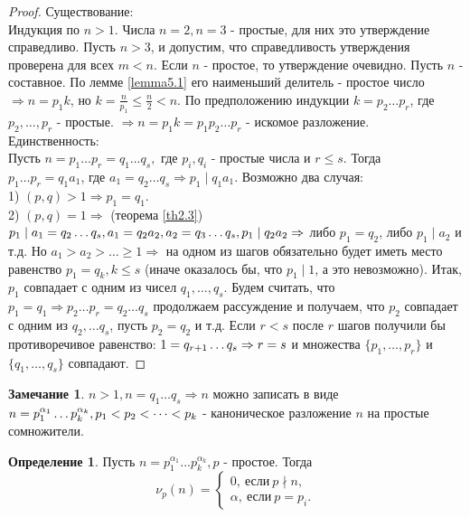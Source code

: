 \documentclass[a4paper, 12pt]{article}
\renewcommand{\div}{\mid}
\newcommand{\ndiv}{\nmid}
\theoremstyle{definition}
\newtheorem{definition}{Определение}[section]
\newtheorem*{comm}{Замечание}
\begin{document}
    \begin{proof}
        Существование:\\ Индукция по $n>1$. Числа $n=2, n=3$ - простые, для них это утверждение справедливо. Пусть $n>3$, и допустим, что справедливость утверждения проверена для всех $m<n$. Если $n$ - простое, то утверждение очевидно. Пусть $n$ - составное. По лемме \ref{lemma5.1} его наименьший делитель - простое число $\Rightarrow n=p_1k$, но $k=\frac{n}{p_1}\leq \frac{n}{2}<n$. По предположению индукции $k=p_2\dots p_r$, где $p_2,\dots,p_r$ - простые. $\Rightarrow n=p_1k=p_1p_2\dots p_r$ - искомое разложение.\\
        Единственность:\\
        Пусть $n=p_1\dots p_r=q_1\dots q_s,$ где $p_i,q_i$ - простые числа и $r\leq s$. Тогда\\ $p_1\dots p_r=q_1a_1$, где $a_1=q_2\dots q_s \Rightarrow p_1 \div q_1a_1$. Возможно два случая:\\
        1) $(p,q)>1 \Rightarrow p_1=q_1$.\\
        2) $(p,q)=1 \Rightarrow$ (теорема \ref{th2.3}) $p_1 \div a_1=q_2\dots q_s, a_1=q_2a_2, a_2=q_3\dots q_s,\\ p_1 \div q_2a_2\Rightarrow$ либо $p_1=q_2$, либо $p_1\div a_2$ и т.д. Но $a_1>a_2>\dots\geq 1 \Rightarrow$ на одном из шагов обязательно будет иметь место равенство $p_1=q_k, k\leq s$ (иначе оказалось бы, что $p_1 \div 1$, а это невозможно). Итак, $p_1$ совпадает с одним из чисел $q_1,\dots,q_s$. Будем считать, что $p_1=q_1 \Rightarrow p_2\dots p_r=q_2\dots q_s$ продолжаем рассуждение и получаем, что $p_2$ совпадает с одним из $q_2,\dots q_s$, пусть $p_2=q_2$ и т.д. Если $r<s$ после $r$ шагов получили бы противоречивое равенство: $1=q_{r+1}\dots q_s \\ \Rightarrow r=s$ и множества $\{p_1,\dots, p_r\}$ и $\{q_1, \dots , q_s\}$ совпадают.
    \end{proof}
    \begin{comm}
        $n>1, n=q_1\dots q_s \Rightarrow n$ можно записать в виде $n=p_1^{\alpha_1}\dots p_k^{\alpha_k}, \\ p_1<p_2<\dots<p_k$ - каноническое разложение $n$ на простые сомножители.
    \end{comm} 
    \begin{definition}
        Пусть $n=p_1^{\alpha_1}\dots p_k^{\alpha_k}, p$ - простое. Тогда
        \[\nu_p(n)=
        \begin{cases}
            0,\ \text{если}\ p\ndiv n,\\
            \alpha,\ \text{если} \ p=p_i. 
        \end{cases}\]
    \end{definition}    
\end{document}
